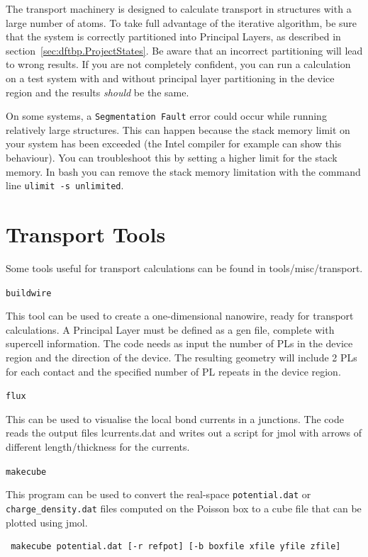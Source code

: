The \dftbp{} transport machinery is designed to calculate transport in
structures with a large number of atoms. To take full advantage of the iterative
algorithm, be sure that the system is correctly partitioned into Principal
Layers, as described in section~\ref{sec:dftbp.ProjectStates}. Be aware that an
incorrect partitioning will lead to wrong results. If you are not completely
confident, you can run a calculation on a test system with and without principal
layer partitioning in the device region and the results {\em should} be the
same.


On some systems, a \verb|Segmentation Fault| error could occur while running
relatively large structures. This can happen because the stack memory limit on
your system has been exceeded (the Intel compiler for example can show this
behaviour). You can troubleshoot this by setting a higher limit for the stack
memory. In bash you can remove the stack memory limitation with the command line
\verb|ulimit -s unlimited|.

\section{Transport Tools}
\label{sec:transport.tools}

Some tools useful for transport calculations can be found in
tools/misc/transport.

\verb|buildwire|

This tool can be used to create a one-dimensional nanowire, ready for transport
calculations. A Principal Layer must be defined as a gen file, complete with
supercell information.  The code needs as input the number of PLs in the device
region and the direction of the device. The resulting geometry will include 2
PLs for each contact and the specified number of PL repeats in the device
region.


\verb|flux|

This can be used to visualise the local bond currents in a junctions. The code
reads the output files lcurrents.dat and writes out a script for jmol with
arrows of different length/thickness for the currents.


\verb|makecube|

This program can be used to convert the real-space \verb|potential.dat| or
\verb|charge_density.dat| files computed on the Poisson box to a cube file that
can be plotted using jmol.

\begin{verbatim}
 makecube potential.dat [-r refpot] [-b boxfile xfile yfile zfile]
\end{verbatim}


